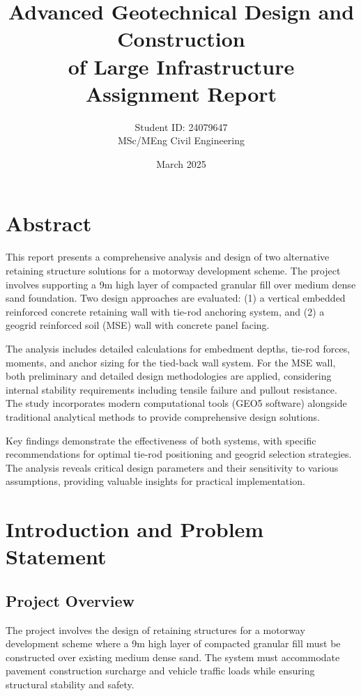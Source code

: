 \documentclass[10pt,a4paper,twocolumn]{article}
\title{\textbf{Advanced Geotechnical Design and Construction\\of Large Infrastructure\\Assignment Report}}
\author{Student ID: 24079647\\MSc/MEng Civil Engineering}
\date{March 2025}
\begin{document}
\maketitle
\thispagestyle{empty}

\newpage
\tableofcontents

\newpage
\section{Abstract}

This report presents a comprehensive analysis and design of two alternative retaining structure solutions for a motorway development scheme. The project involves supporting a 9m high layer of compacted granular fill over medium dense sand foundation. Two design approaches are evaluated: (1) a vertical embedded reinforced concrete retaining wall with tie-rod anchoring system, and (2) a geogrid reinforced soil (MSE) wall with concrete panel facing.

The analysis includes detailed calculations for embedment depths, tie-rod forces, moments, and anchor sizing for the tied-back wall system. For the MSE wall, both preliminary and detailed design methodologies are applied, considering internal stability requirements including tensile failure and pullout resistance. The study incorporates modern computational tools (GEO5 software) alongside traditional analytical methods to provide comprehensive design solutions.

Key findings demonstrate the effectiveness of both systems, with specific recommendations for optimal tie-rod positioning and geogrid selection strategies. The analysis reveals critical design parameters and their sensitivity to various assumptions, providing valuable insights for practical implementation.

\newpage



\section{Introduction and Problem Statement}

\subsection{Project Overview}
The project involves the design of retaining structures for a motorway development scheme where a 9m high layer of compacted granular fill must be constructed over existing medium dense sand. The system must accommodate pavement construction surcharge and vehicle traffic loads while ensuring structural stability and safety.
\end{document}

